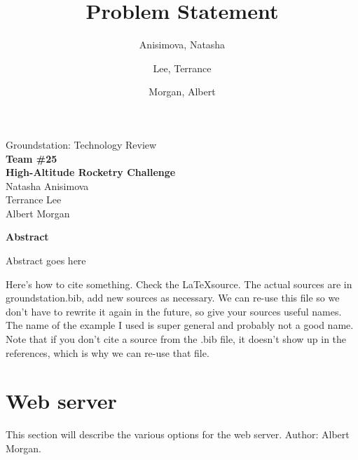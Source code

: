 \documentclass[10pt,draftclsnofoot,onecolumn]{IEEEtran}
\begin{document}
	\singlespace
	
	\title{\vspace{2in}Problem Statement}
	
	\author {
		Anisimova, Natasha
		\and
		Lee, Terrance
		\and
		Morgan, Albert
	}
	
	
	\pagestyle{empty}
	\vspace*{2in}
	\begin{center}
		\huge
		Groundstation: Technology Review\\
		\normalsize
		\vspace{5mm}
		\textbf{
			Team \#25\\
			High-Altitude Rocketry Challenge\\
		}
		\vspace{1mm}
		Natasha Anisimova\\
		Terrance Lee\\
		Albert Morgan
	\end{center}
	
	\vspace{5mm}
	
	\begin{center}
		\textbf{Abstract}
	\end{center}
	
	
	Abstract goes here
	
	
	\newpage
	
	Here's how to cite something\cite{geom}.
	Check the \LaTeX source.
	The actual sources are in groundstation.bib, add new sources as necessary.
	We can re-use this file so we don't have to rewrite it again in the future, so give your sources useful names.
	The name of the example I used is super general and probably not a good name.
	Note that if you don't cite a source from the .bib file, it doesn't show up in the references, which is why we can re-use that file.

	\newpage

	
	\pagestyle{headings}



	\section{Web server}
	This section will describe the various options for the web server. Author: Albert Morgan.
\end{document}
